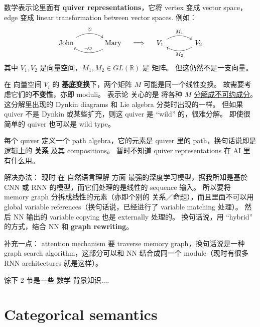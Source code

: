 \documentclass[12pt, orivec]{article}
\begin{document}
\begin{tcolorbox}[breakable, parbox=false]
数学表示论里面有 \textbf{quiver representations}，它将 vertex 变成 vector space，edge 变成 linear transformation between vector spaces. 例如：
\begin{equation}
\begin{tikzcd}[column sep = large]
\mbox{John} \arrow[r, bend left, "\heartsuit"] & \arrow[l, bend left, swap, "\neg \heartsuit"] \mbox{Mary}
\end{tikzcd}
\quad \Longrightarrow \quad
\begin{tikzcd}[column sep = large]
V_1 \arrow[r, bend left, "M_1"] & \arrow[l, bend left, "M_2"] V_2
\end{tikzcd}
\end{equation}
其中 $V_1, V_2$ 是向量空间，$M_1, M_2 \in GL(\mathbb{R})$ 是 矩阵。  但这仍然不是一支向量。  

在 向量空间 $V_i$ 的 \textbf{基底变换}下，两个矩阵 $M$ 可能是同一个线性变换。  故需要考虑它们的\textbf{不变性}，亦即 moduli。 表示论 关心的是 将各种 $M$ \uline{分解成不可约成分}。 这分解里出现的 Dynkin diagrams 和 Lie algebra 分类时出现的一样。  但如果 quiver 不是 Dynkin 或某些扩充，则这 quiver 是 ``wild'' 的，很难分解。 即使很简单的 quiver 也可以是 wild type。

每个 quiver 定义一个 path algebra，它的元素是 quiver 里的 path，换句话说即是逻辑上的 \textbf{关系} 及其 compositions。 暂时不知道 quiver representations 在 AI 里有什么用。
\end{tcolorbox}

解决办法： 现时 在 自然语言理解 方面 最强的深度学习模型，据我所知是基於 CNN 或 RNN 的模型，而它们处理的是线性的 sequence 输入。 所以要将 memory graph 分拆成线性的元素（亦即个别的 关系／命题），而且里面不可以用 global variable references（换句话说，已经进行了 variable matching 处理）。  然后 NN 输出的 variable copying 也是 externally 处理的。 换句话说，用 ``hybrid'' 的方式，结合 NN 和 \textbf{graph rewriting}。

补充一点： attention mechanism 要 traverse memory graph，换句话说是一种 graph search algorithm，这部分可以和 NN 结合成同一个 module（现时有很多 RNN architectures 就是这样）。

馀下 2 节是一些 数学 背景知识....

\section{Categorical semantics}
\label{Categorical-semantics}
\end{document}
